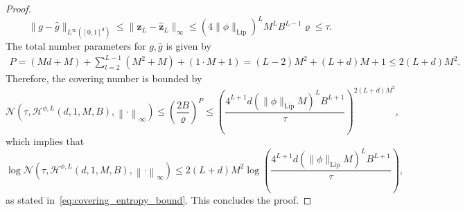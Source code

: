 \documentclass[10pt,a4paper]{amsart}
\newcommand{\bz}{\fbf{z}}
\newcommand{\fbf}[1]{\boldsymbol{#1}}
\renewcommand{\le}{\leqslant}
\renewcommand{\leq}{\le}
\begin{document}
\begin{proof}
    \begin{equation*}
        \|g - \widehat{g}\|_{L^{\infty}([0,1]^d)} \leq \|\bz_L - \widehat{\bz}_L\|_{\infty} \leq (4\|\phi\|_{\mathrm{Lip}} )^{L} M^{L} B^{L-1} \varrho \leq \tau. 
    \end{equation*}
    The total number parameters for $g, \widehat{g}$ is given by 
    \begin{equation*}
        \begin{aligned}
            P  = (M d + M) + \sum_{l=2}^{L-1} (M^2 + M) + (1 \cdot M + 1) = (L - 2) M^2 + (L + d ) M + 1 \leq 2 (L + d) M^2.
        \end{aligned}
    \end{equation*}
    Therefore, the covering number is bounded by 
    \begin{equation*}
        \mathcal{N}(\tau, \mathcal{H}^{\phi,L}(d, 1, M, B), \left\|\cdot\right\|_\infty) \leq \left( \frac{2B}{\varrho}\right)^{P} \leq \left( \frac{4^{L+1} d ( \|\phi\|_{\mathrm{Lip}} M)^{L} B^{L+1}}{\tau}\right)^{2(L+d) M^2},
    \end{equation*}
    which implies that 
    \begin{equation*}
        \log \mathcal{N}(\tau, \mathcal{H}^{\phi,L}(d, 1, M, B), \left\|\cdot\right\|_\infty)  \leq 2 (L+d) M^2 \log \left( \frac{4^{L+1}d( \|\phi\|_{\mathrm{Lip}} M)^{L} B^{L+1}}{\tau}\right),
    \end{equation*}
    as stated in~\eqref{eq:covering_entropy_bound}. This concludes the proof.
\end{proof}
\end{document}
